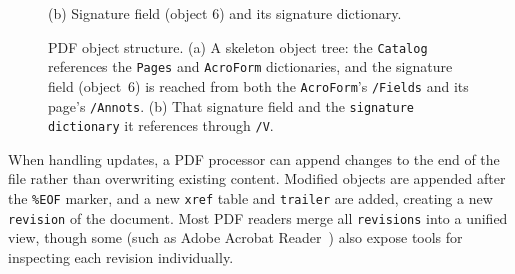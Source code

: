 \documentclass[12pt]{article}
\begin{document}
\begin{figure}[htb]
\begin{minipage}[b]{0.50\linewidth}
		{\footnotesize (b) Signature field (object 6) and its signature dictionary.}
	\end{minipage}
	\caption{PDF object structure. (a) A skeleton object tree: the \texttt{Catalog} references the \texttt{Pages} and \texttt{AcroForm} dictionaries, and the signature field (object~6) is reached from both the \texttt{AcroForm}'s \texttt{/Fields} and its page's \texttt{/Annots}. (b) That signature field and the \texttt{signature dictionary} it references through \texttt{/V}.\label{fig:pdf-structure}}
\end{figure}



When handling updates, a PDF processor can append changes to the end of the file rather than
overwriting existing content. Modified objects are appended after the \texttt{\%EOF} marker, and a new \texttt{xref} table and \texttt{trailer} are added, creating a new \texttt{revision} of the document.
%
Most PDF readers merge all \texttt{revisions} into a unified view, though some (such as Adobe Acrobat Reader~\cite{adobereader}) also expose tools for inspecting each revision individually.
\end{document}
